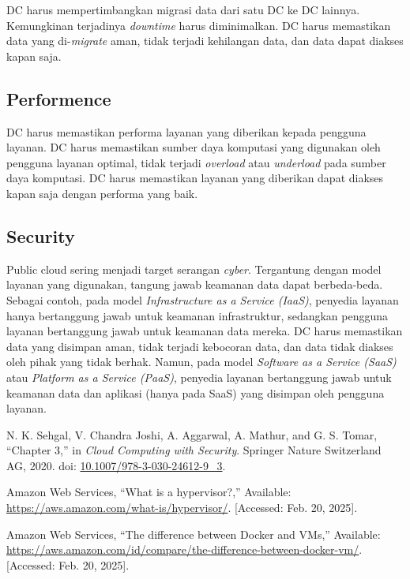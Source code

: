 \documentclass[conference]{IEEEtran}
\begin{document}
DC harus mempertimbangkan migrasi data dari satu DC ke DC lainnya. Kemungkinan terjadinya \textit{downtime} harus diminimalkan. DC harus memastikan data yang di-\textit{migrate} aman, tidak terjadi kehilangan data, dan data dapat diakses kapan saja.

\subsection{Performence}

DC harus memastikan performa layanan yang diberikan kepada pengguna layanan. DC harus memastikan sumber daya komputasi yang digunakan oleh pengguna layanan optimal, tidak terjadi \textit{overload} atau \textit{underload} pada sumber daya komputasi. DC harus memastikan layanan yang diberikan dapat diakses kapan saja dengan performa yang baik.

\subsection{Security}

Public cloud sering menjadi target serangan \textit{cyber}. Tergantung dengan model layanan yang digunakan, tangung jawab keamanan data dapat berbeda-beda. Sebagai contoh, pada model \textit{Infrastructure as a Service (IaaS)}, penyedia layanan hanya bertanggung jawab untuk keamanan infrastruktur, sedangkan pengguna layanan bertanggung jawab untuk keamanan data mereka. DC harus memastikan data yang disimpan aman, tidak terjadi kebocoran data, dan data tidak diakses oleh pihak yang tidak berhak. Namun, pada model \textit{Software as a Service (SaaS)} atau \textit{Platform as a Service (PaaS)}, penyedia layanan bertanggung jawab untuk keamanan data dan aplikasi (hanya pada SaaS) yang disimpan oleh pengguna layanan.

\begin{thebibliography}{3}

 N. K. Sehgal, V. Chandra Joshi, A. Aggarwal, A. Mathur, and G. S. Tomar, ``Chapter 3,'' in \textit{Cloud Computing with Security}. Springer Nature Switzerland AG, 2020. doi: \href{https://doi.org/10.1007/978-3-030-24612-9_3}{10.1007/978-3-030-24612-9\_3}.

 Amazon Web Services, ``What is a hypervisor?,'' Available: \href{https://aws.amazon.com/what-is/hypervisor/}{https://aws.amazon.com/what-is/hypervisor/}. [Accessed: Feb. 20, 2025].

 Amazon Web Services, ``The difference between Docker and VMs,'' Available: \href{https://aws.amazon.com/id/compare/the-difference-between-docker-vm/}{https://aws.amazon.com/id/compare/the-difference-between-docker-vm/}. [Accessed: Feb. 20, 2025].

\end{thebibliography}
\end{document}

